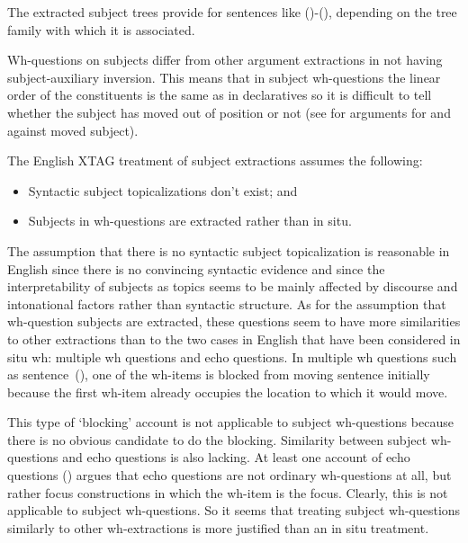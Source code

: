 The extracted subject trees provide for sentences like ()-(),
depending on the tree family with which it is associated.


Wh-questions on subjects differ from other argument extractions in
not having subject-auxiliary inversion.  This means that in subject
wh-questions the linear order of the constituents is the same as in
declaratives so it is difficult to tell whether the subject has moved
out of position or not (see \cite{heycock/kroch93gagl} for arguments
for and against moved subject). 

The English XTAG treatment of subject extractions assumes the
following:

\begin{itemize}
\item Syntactic subject topicalizations don't exist; and 
\item Subjects in wh-questions are extracted rather than in situ.
\end{itemize}

The assumption that there is no syntactic subject topicalization is reasonable
in English since there is no convincing syntactic evidence and since the
interpretability of subjects as topics seems to be mainly affected by discourse
and intonational factors rather than syntactic structure. As for the assumption
that wh-question subjects are extracted, these questions seem to have more
similarities to other extractions than to the two cases in English that have
been considered in situ wh: multiple wh questions and echo questions. In
multiple wh questions such as sentence~(), one of the wh-items is blocked
from moving sentence initially because the first wh-item already occupies the
location to which it would move.


This type of `blocking' account is not applicable to
subject wh-questions because there is no obvious candidate to do the
blocking.  Similarity between subject wh-questions and echo questions
is also lacking.  At least one account of echo questions
(\cite{hockey94}) argues that echo questions are not ordinary
wh-questions at all, but rather focus constructions in which the
wh-item is the focus. Clearly, this is not applicable to subject
wh-questions. So it seems that treating subject wh-questions similarly
to other wh-extractions is more justified than an in situ treatment. 

